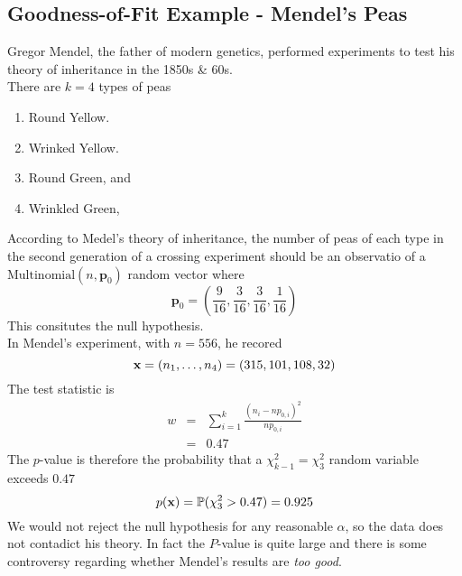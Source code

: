 \documentclass[11pt,a4paper]{article}
\begin{document}
\subsection{Goodness-of-Fit Example - Mendel's Peas}
Gregor Mendel, the father of modern genetics, performed experiments to test his theory of inheritance in the 1850s \& 60s.\\
There are $k=4$ types of peas
\begin{enumerate}
	\item Round Yellow.
	\item Wrinked Yellow.
	\item Round Green, and
	\item Wrinkled Green,
\end{enumerate}
According to Medel's theory of inheritance, the number of peas of each type in the second generation of a crossing experiment should be an observatio of a $\text{Multinomial}(n,\textbf{p}_0)$ random vector where
$$\textbf{p}_0=\left(\frac{9}{16},\frac{3}{16},\frac{3}{16},\frac{1}{16}\right)$$
This consitutes the null hypothesis.\\
In Mendel's experiment, with $n=556$, he recored
$$\textbf{x}=(n_1,\dots,n_4)=(315,101,108,32)$$
The test statistic is
\[\begin{array}{rcl}
w&=&\displaystyle\sum_{i=1}^k\frac{(n_i-np_{0,i})^2}{np_{0,i}}\\
&=&0.47
\end{array}\]
The $p$-value is therefore the probability that a $\chi^2_{k-1}=\chi^2_3$ random variable exceeds $0.47$
$$p(\textbf{x})=\mathbb{P}(\chi^2_3>0.47)=0.925$$
We would not reject the null hypothesis for any reasonable $\alpha$, so the data does not contadict his theory.
In fact the $P$-value is quite large and there is some controversy regarding whether Mendel's results are \textit{too good}.\\
\end{document}
